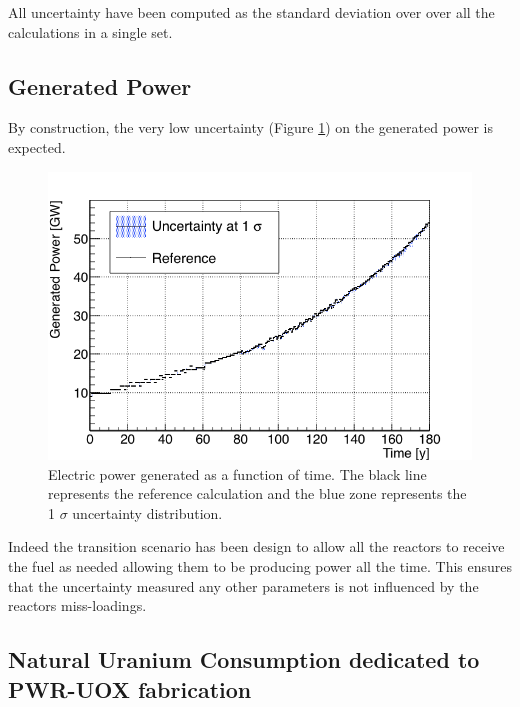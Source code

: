 \documentclass{anstrans}
\begin{document}
All uncertainty have been computed as the standard deviation over over all the
calculations in a single set.


\subsection{Generated Power}

By construction, the very low uncertainty (Figure \ref{fig:power_full}) on the
generated power is expected.

\begin{figure}[h!] %
    \centering
    \includegraphics[scale=0.35]{power_full}
    \caption{Electric power generated as a function of time.  The black line
        represents the reference calculation and the blue zone
        represents the 1 $\sigma$ uncertainty distribution.}\label{fig:power_full}
\end{figure}

Indeed the transition scenario has been design to allow all the reactors to
receive the fuel as needed allowing them to be producing power all the time.
This ensures that the uncertainty measured any other parameters is not
influenced by the reactors miss-loadings.


\subsection{Natural Uranium Consumption dedicated to PWR-UOX fabrication}
\end{document}
